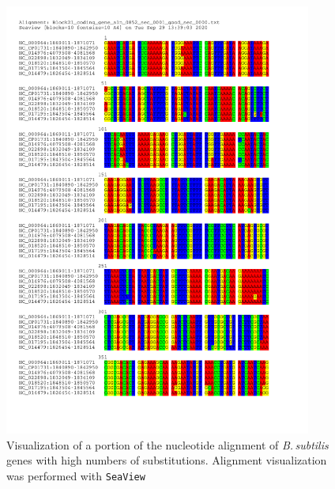 \documentclass[11pt]{article}
\newcommand{\bass}{\textit{B.\,subtilis}\xspace}
\providecommand{\DIFaddbegin}{} %
\providecommand{\DIFaddend}{} %
\begin{document}
\DIFaddend \begin{figure}[H]
	\begin{center}
		\includegraphics[width=0.9\textwidth]{./figs/Bacillus_high_substitutions_gene_example_nucleotide_alignment.pdf}
		\caption{\label{fig:nucaln} Visualization of a portion of the nucleotide alignment of \bass genes with high numbers of substitutions. Alignment visualization was performed with \texttt{SeaView} \citep{Gouy:10}}
	\end{center}
\end{figure}

\DIFaddbegin \newpage
\end{document}
